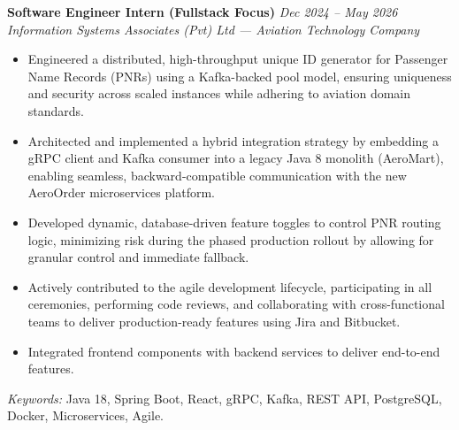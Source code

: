 \textbf{Software Engineer Intern (Fullstack Focus)} \hfill \textit{Dec 2024 – May 2026} \\
\textit{Information Systems Associates (Pvt) Ltd — Aviation Technology Company}

\begin{itemize}[leftmargin=*]
    \item Engineered a distributed, high-throughput unique ID generator for Passenger Name Records (PNRs) using a Kafka-backed pool model, ensuring uniqueness and security across scaled instances while adhering to aviation domain standards.
    \item Architected and implemented a hybrid integration strategy by embedding a gRPC client and Kafka consumer into a legacy Java 8 monolith (AeroMart), enabling seamless, backward-compatible communication with the new AeroOrder microservices platform.
    \item Developed dynamic, database-driven feature toggles to control PNR routing logic, minimizing risk during the phased production rollout by allowing for granular control and immediate fallback.
    \item Actively contributed to the agile development lifecycle, participating in all ceremonies, performing code reviews, and collaborating with cross-functional teams to deliver production-ready features using Jira and Bitbucket.
    \item Integrated frontend components with backend services to deliver end-to-end features.
\end{itemize}

\textit{Keywords:} Java 18, Spring Boot, React, gRPC, Kafka, REST API, PostgreSQL, Docker, Microservices, Agile.
